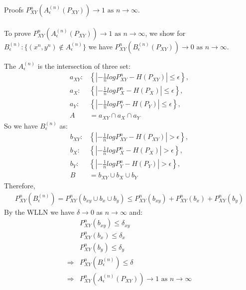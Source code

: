 \documentclass[
  course = {{EE623 Information Theory}},
  quartile = {{Fall 2020}},
  assignment = 7,
  name = {{Mohammad Mahdi Rahimi}},
  studentnumber = {{20208244}},
  email = {{mahi@kaist.ac.kr}},
  firstexercise = 1
]{aga-homework}
\begin{document}
\exercise Proofs
\subexercise $P^n_{XY}(A^{(n)}_\epsilon(P_{XY})) \rightarrow 1\text{ as } n \rightarrow \infty$.
\\\\
To prove $P^n_{XY}(A^{(n)}_\epsilon(P_{XY})) \rightarrow 1\text{ as } n \rightarrow \infty$, we show for $B^{(n)}_\epsilon: \{(x^n, y^n) \notin A^{(n)}_\epsilon\}$ we have $P^n_{XY}(B^{(n)}_\epsilon(P_{XY})) \rightarrow 0\text{ as } n \rightarrow \infty$.

The $A^{(n)}_\epsilon$ is the intersection of three set: 
\begin{equation} \label{eq1}
\begin{split}
a_{XY}:& \left\{\left|-\frac{1}{n}logP^n_{XY} - H(P_{XY})\right| \le \epsilon \right\},\\
a_X:& \left\{\left|-\frac{1}{n}logP^n_{X} - H(P_{X})\right| \le \epsilon \right\},\\
a_Y:& \left\{\left|-\frac{1}{n}logP^n_{Y} - H(P_{Y})\right| \le \epsilon \right\},\\
A &= a_{XY} \cap a_X \cap a_Y
\end{split}
\end{equation}
So we have $B^{(n)}_\epsilon$ as:
\begin{equation} \label{eq2}
\begin{split}
b_{XY}:& \left\{\left|-\frac{1}{n}logP^n_{XY} - H(P_{XY})\right| > \epsilon \right\},\\
b_X:& \left\{\left|-\frac{1}{n}logP^n_{X} - H(P_{X})\right| > \epsilon \right\},\\
b_Y:& \left\{\left|-\frac{1}{n}logP^n_{Y} - H(P_{Y})\right| > \epsilon \right\},\\
B &= b_{XY} \cup b_X \cup b_Y
\end{split}
\end{equation}
Therefore,
\begin{equation} \label{eq3}
\begin{split}
P^n_{XY}(B^{(n)}_\epsilon) = P^n_{XY}(b_{xy} \cup b_x \cup b_y) \le P^n_{XY}(b_{xy}) + P^n_{XY}(b_x) + P^n_{XY}(b_y)
\end{split}
\end{equation}
By the WLLN we have $\delta \rightarrow 0 $ as $n \rightarrow \infty$ and:
\begin{equation} \label{eq4}
\begin{split}
&P^n_{XY}(b_{xy}) \le \delta_{xy} \\
&P^n_{XY}(b_x) \le \delta_x\\
&P^n_{XY}(b_y) \le \delta_y\\
\Rightarrow &P^n_{XY}(B^{(n)}_\epsilon) \le \delta\\
\Rightarrow &P^n_{XY}(A^{(n)}_\epsilon(P_{XY})) \rightarrow 1 \text{ as } n \rightarrow \infty 
\end{split}
\end{equation}
\end{document}
